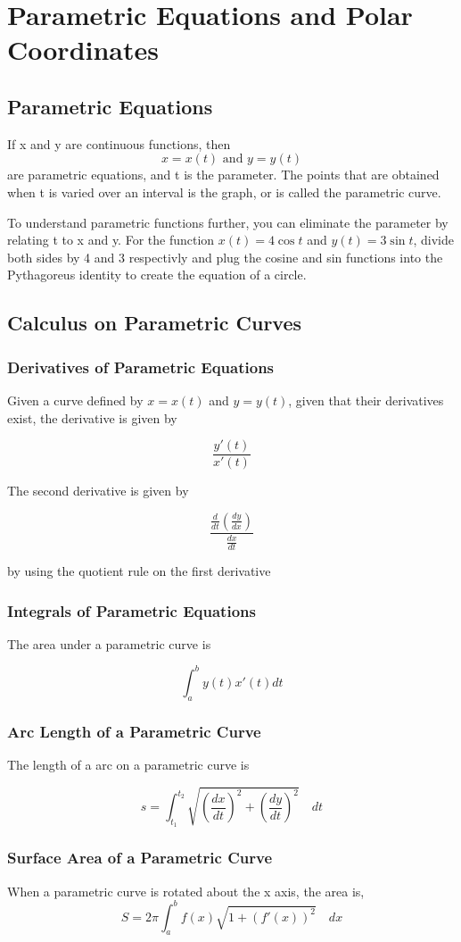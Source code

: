 \documentclass[../main.tex]{subfiles}
\begin{document}
\section{Parametric Equations and Polar Coordinates}

\subsection{Parametric Equations}

If x and y are continuous functions, then 
\[ x = x(t) \text{ and } y = y(t) \]
are parametric equations, and t is the parameter. The points that are obtained 
when t is varied over an interval is the graph, or is called the parametric curve.
\smallskip
\par To understand parametric functions further, you can eliminate the parameter by 
relating t to x and y. For the function $x(t) = 4\cos t$ and $y(t) = 3\sin t$, 
divide both sides by 4 and 3 respectivly and plug the cosine and sin functions into 
the Pythagoreus identity to create the equation of a circle.

\subsection{Calculus on Parametric Curves}
\subsubsection{Derivatives of Parametric Equations}
Given a curve defined by $x = x(t)$ and $y = y(t)$, given that their derivatives 
exist, the derivative is given by

\[ \frac{y'(t)}{x'(t)} \]

The second derivative is given by 

\[ \frac{\frac{d}{dt}(\frac{dy}{dx})}{\frac{dx}{dt}} \]

by using the quotient rule on the first derivative

\subsubsection{Integrals of Parametric Equations}

The area under a parametric curve is

\[ \int_a^b y(t)x'(t) dt \]

\subsubsection{Arc Length of a Parametric Curve}

The length of a arc on a parametric curve is

\[ s = \int_{t_1}^{t_2} \sqrt{(\frac{dx}{dt})^2 + (\frac{dy}{dt})^2} \quad  dt \] 

\subsubsection{Surface Area of a Parametric Curve}

When a parametric curve is rotated about the x axis, the area is, 
\[ S = 2 \pi \int_a^b f(x) \sqrt{1+(f'(x))^2} \quad dx \]
\end{document}
